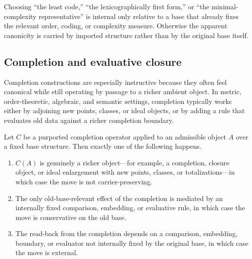 \begin{example}
Choosing ``the least code,'' ``the lexicographically first form,'' or ``the minimal-complexity representative'' is internal only relative to a base that already fixes the relevant order, coding, or complexity measure. Otherwise the apparent canonicity is carried by imported structure rather than by the original base itself.
\end{example}

\subsection{Completion and evaluative closure}

Completion constructions are especially instructive because they often feel canonical while still operating by passage to a richer ambient object. In metric, order-theoretic, algebraic, and semantic settings, completion typically works either by adjoining new points, classes, or ideal objects, or by adding a rule that evaluates old data against a richer completion boundary.

\begin{proposition}\label{prop:case-completion}
Let $C$ be a purported completion operator applied to an admissible object $A$ over a fixed base structure. Then exactly one of the following happens.
\begin{enumerate}[label=(\alph*)]
    \item $C(A)$ is genuinely a richer object---for example, a completion, closure object, or ideal enlargement with new points, classes, or totalizations---in which case the move is not carrier-preserving.
    \item The only old-base-relevant effect of the completion is mediated by an internally fixed comparison, embedding, or evaluative rule, in which case the move is conservative on the old base.
    \item The read-back from the completion depends on a comparison, embedding, boundary, or evaluator not internally fixed by the original base, in which case the move is external.
\end{enumerate}
\end{proposition}

